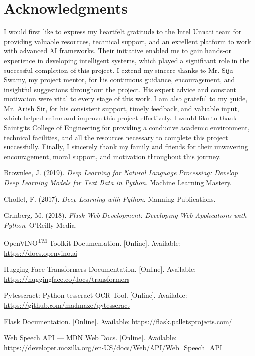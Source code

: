 \documentclass{josis}
\begin{document}
\begin{figure}[h]
\begin{minipage}{0.45\textwidth}
    \label{fig:minipage2}
  \end{minipage}
\end{figure}
\section*{Acknowledgments}
I would first like to express my heartfelt gratitude to the Intel Unnati team for providing valuable resources, technical support, and an excellent platform to work with advanced AI frameworks. Their initiative enabled me to gain hands-on experience in developing intelligent systems, which played a significant role in the successful completion of this project.
I extend my sincere thanks to Mr. Siju Swamy, my project mentor, for his continuous guidance, encouragement, and insightful suggestions throughout the project. His expert advice and constant motivation were vital to every stage of this work.
I am also grateful to my guide, Mr. Anish Sir, for his consistent support, timely feedback, and valuable input, which helped refine and improve this project effectively.
I would like to thank Saintgits College of Engineering for providing a conducive academic environment, technical facilities, and all the resources necessary to complete this project successfully.
Finally, I sincerely thank my family and friends for their unwavering encouragement, moral support, and motivation throughout this journey.
\cite{brownlee2019}
\begin{thebibliography}{8}

Brownlee, J. (2019). \textit{Deep Learning for Natural Language Processing: Develop Deep Learning Models for Text Data in Python}. Machine Learning Mastery.

Chollet, F. (2017). \textit{Deep Learning with Python}. Manning Publications.

Grinberg, M. (2018). \textit{Flask Web Development: Developing Web Applications with Python}. O'Reilly Media.

OpenVINO\textsuperscript{TM} Toolkit Documentation. [Online]. Available: \url{https://docs.openvino.ai}

Hugging Face Transformers Documentation. [Online]. Available: \url{https://huggingface.co/docs/transformers}

Pytesseract: Python-tesseract OCR Tool. [Online]. Available: \url{https://github.com/madmaze/pytesseract}

Flask Documentation. [Online]. Available: \url{https://flask.palletsprojects.com/}

Web Speech API — MDN Web Docs. [Online]. Available: \url{https://developer.mozilla.org/en-US/docs/Web/API/Web_Speech_API}

\end{thebibliography}
\appendix
\end{document}

